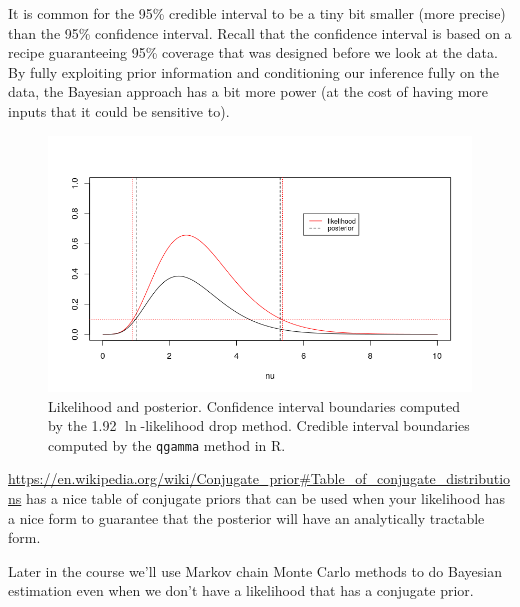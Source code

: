 \documentclass[11pt]{article}
\begin{document}
It is common for the 95\% credible interval to be a tiny bit smaller (more
precise) than the 95\% confidence interval.
Recall that the confidence interval is based on a recipe guaranteeing
    95\% coverage that was designed before we look at the data.
By fully exploiting prior information and conditioning our inference fully
on the data, the Bayesian approach has a bit more power (at the cost of 
having more inputs that it could be sensitive to).

\begin{figure}[h]
\hskip-1cm \includegraphics[scale=1]{images/dueling-cis.png}
\caption{Likelihood and posterior. Confidence interval boundaries computed
by the 1.92 $\ln$-likelihood drop method. Credible interval boundaries
computed by the {\tt qgamma} method in R. }\label{cis}
\end{figure}

\url{https://en.wikipedia.org/wiki/Conjugate_prior#Table_of_conjugate_distributions}
has a nice table of conjugate priors that can be used when your likelihood has a nice form
to guarantee that the posterior will have an analytically tractable form.

Later in the course we'll use Markov chain Monte Carlo methods to do Bayesian
    estimation even when we don't have a likelihood that has a conjugate prior.
    
\end{document}
